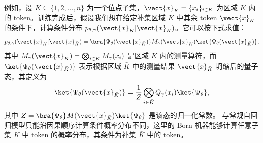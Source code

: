 例如，设 $K\subseteq\{1,2,...,n\}$ 为一个位点子集，$\vect{x}_{K}=\{x_i\}_{i\in K}$ 为区域 $K$ 内的 token。训练完成后，假设我们想在给定补集区域 $\bar{K}$ 中其余 token $\vect{x}_{\bar{K}}$ 的条件下，计算条件分布 $p_{\theta,\gamma}(\vect{x}_K|\vect{x}_{\bar{K}})$。它可以按下式求值：
\begin{equation}\label{eq: single site}
    p_{\theta,\gamma}(\vect{x}_K|\vect{x}_{\bar{K}})=\bra{\Psi_\theta(\vect{x}_{\bar{K}})}M_{\gamma}(\vect{x}_K)\ket{\Psi_\theta(\vect{x}_{\bar{K}})},
\end{equation}
其中 $M_{\gamma}(\vect{x}_K)=\bigotimes_{i\in K}M_{\gamma}(x_i)$ 是区域 $K$ 内的测量算符，而 $\ket{\Psi_\theta(\vect{x}_{\bar{K}})}$ 表示根据区域 $\bar{K}$ 中的测量结果 $\vect{x}_{\bar{K}}$ 坍缩后的量子态，其定义为
\begin{equation}
\ket{\Psi_\theta(\vect{x}_{\bar{K}})}=\frac{1}{Z}\bigotimes_{i\in\bar{K}}Q_{\gamma}(x_i)\ket{\Psi_{\theta}},
\end{equation}
其中 $Z=\bra{\Psi_\theta}M(\vect{x}_{\bar{K}})\ket{\Psi_\theta}$ 是该态的归一化常数。
与常规自回归模型只能沿因果顺序计算条件概率分布不同，这里的 Born 机器能够计算任意子集 $K$ 中 token 的概率分布，其条件为补集 $\bar{K}$ 中的 token。

